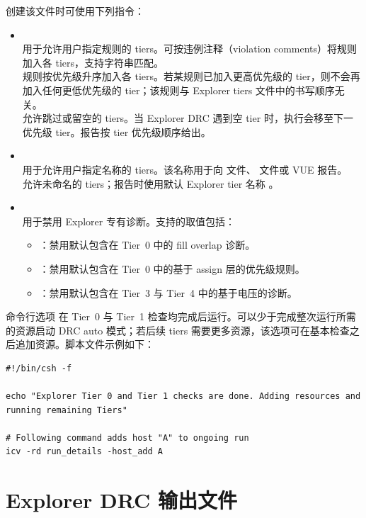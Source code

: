 创建该文件时可使用下列指令：
\begin{itemize}
  \item {}\\
  用于允许用户指定规则的 tiers。可按违例注释（violation comments）将规则加入各 tiers，支持字符串匹配。\\
  规则按优先级升序加入各 tiers。若某规则已加入更高优先级的 tier，则不会再加入任何更低优先级的 tier；该规则与 Explorer tiers 文件中的书写顺序无关。\\
  允许跳过或留空的 tiers。当 Explorer DRC 遇到空 tier 时，执行会移至下一优先级 tier。报告按 tier 优先级顺序给出。

  \item {}\\
  用于允许用户指定名称的 tiers。该名称用于向  文件、 文件或 VUE 报告。\\
  允许未命名的 tiers；报告时使用默认 Explorer tier 名称 。

  \item {}\\
  用于禁用 Explorer 专有诊断。支持的取值包括：
  \begin{itemize}
    \item {}：禁用默认包含在 Tier~0 中的 fill overlap 诊断。
    \item {}：禁用默认包含在 Tier~0 中的基于 assign 层的优先级规则。
    \item {}：禁用默认包含在 Tier~3 与 Tier~4 中的基于电压的诊断。
  \end{itemize}
\end{itemize}

命令行选项  在 Tier~0 与 Tier~1 检查均完成后运行。可以少于完成整次运行所需的资源启动 DRC auto 模式；若后续 tiers 需要更多资源，该选项可在基本检查之后追加资源。脚本文件示例如下：
\begin{lstlisting}
#!/bin/csh -f

echo "Explorer Tier 0 and Tier 1 checks are done. Adding resources and
running remaining Tiers"

# Following command adds host "A" to ongoing run
icv -rd run_details -host_add A
\end{lstlisting}

\section{Explorer DRC 输出文件}

